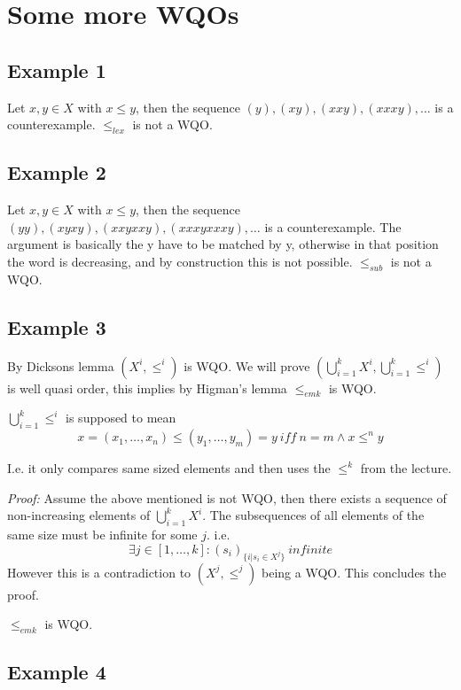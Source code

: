 \section{Some more WQOs}

\subsection{Example 1}

Let $x,y \in X$ with $x \leq y$, then the sequence $(y),(xy),(xxy),(xxxy), \dots$ is a counterexample. $\leq_{lex}$ is not a WQO.

\subsection{Example 2}

Let $x,y \in X$ with $x \leq y$, then the sequence $(yy),(xyxy),(xxyxxy),(xxxyxxxy),\dots$ is a counterexample. The argument is basically the y have to be matched by y, otherwise in that position the word is decreasing, and by construction this is not possible. $\leq_{sub}$ is not a WQO.

\subsection{Example 3}

By Dicksons lemma $(X^i,\leq^i)$ is WQO. We will prove $(\bigcup_{i=1}^k X^i,\bigcup_{i=1}^k \leq^i)$ is well quasi order, this implies by Higman's lemma $\leq_{emk}$ is WQO.

$\bigcup_{i=1}^k \leq^i$ is supposed to mean \[x=(x_1,\dots,x_n) \leq (y_1,\dots,y_m)=y~\textit{iff}~n=m \wedge x \leq^n y\]

I.e. it only compares same sized elements and then uses the $\leq^k$ from the lecture. 

\textit{Proof:} Assume the above mentioned is not WQO, then there exists a sequence of non-increasing elements of $\bigcup_{i=1}^k X^i$. The subsequences of all elements of the same size must be infinite for some $j$. i.e. \[\exists j \in [1,\dots,k]:(s_i)_{\{i|s_i\in X^j\}}~\textit{infinite}\] However this is a contradiction to $(X^j,\leq^j)$ being a WQO. This concludes the proof.

$\leq_{emk}$ is WQO.

\subsection{Example 4}

